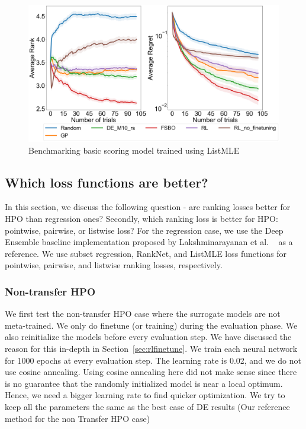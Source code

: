 \documentclass[12pt, twoside, ngerman]{report}
\begin{document}
\begin{figure}[h]
  \centering
    \includegraphics[scale=0.25]{images/RLEvaluationBasicScoring}
    \caption{Benchmarking basic scoring model trained using ListMLE}
    \label{fig:RLEvaluationBasicScoring}
\end{figure}
\fi

\subsection{Which loss functions are better?}

In this section, we discuss the following question - are ranking losses better for HPO than regression ones? Secondly, which ranking loss is better for HPO: pointwise,  pairwise, or listwise loss?
For the regression case,  we use the Deep Ensemble baseline implementation proposed by Lakshminarayanan et al. ~\cite{DeepEnsemblePaper} as a reference. We use subset regression,  RankNet, and ListMLE loss functions for pointwise, pairwise, and listwise ranking losses, respectively. 

\subsubsection{Non-transfer HPO}
We first test the non-transfer HPO case where the surrogate models are not meta-trained. We only do finetune (or training) during the evaluation phase. We also reinitialize the models before every evaluation step. We have discussed the reason for this in-depth in Section~\ref{sec:rlfinetune}.
We train each neural network for 1000 epochs at every evaluation step. The learning rate is 0.02, and we do not use cosine annealing.
Using cosine annealing here did not make sense since there is no guarantee that the randomly initialized model is near a local optimum.
Hence, we need a bigger learning rate to find quicker optimization.
We try to keep all the parameters the same as the best case of DE results (Our reference method for the non Transfer HPO case)
\end{document}
